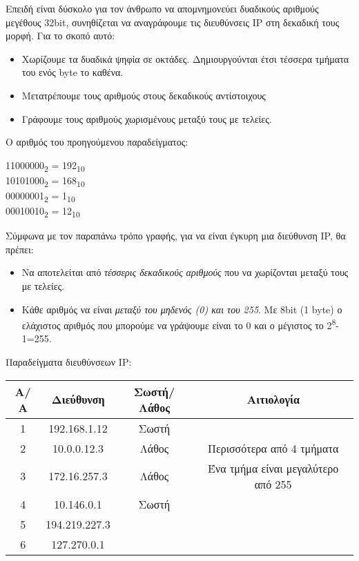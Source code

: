 Επειδή είναι δύσκολο για τον άνθρωπο να απομνημονεύει δυαδικούς αριθμούς μεγέθους 32bit, συνηθίζεται να αναγράφουμε τις διευθύνσεις IP στη δεκαδική τους μορφή. Για το σκοπό αυτό:

\begin{itemize}
\item Χωρίζουμε τα δυαδικά ψηφία σε οκτάδες. Δημιουργούνται έτσι τέσσερα τμήματα του ενός byte το καθένα.
\item Μετατρέπουμε τους αριθμούς στους δεκαδικούς αντίστοιχους
\item Γράφουμε τους αριθμούς χωρισμένους μεταξύ τους με τελείες.
\end{itemize}

Ο αριθμός του προηγούμενου παραδείγματος:

11000000\textsubscript{2} = 192\textsubscript{10}\\
10101000\textsubscript{2} = 168\textsubscript{10}\\
00000001\textsubscript{2} = 1\textsubscript{10}\\
00010010\textsubscript{2} = 12\textsubscript{10}

Σύμφωνα με τον παραπάνω τρόπο γραφής, για να είναι έγκυρη μια διεύθυνση IP, θα πρέπει:

\begin{itemize}
\item Να αποτελείται από \emph{τέσσερις δεκαδικούς αριθμούς} που να χωρίζονται μεταξύ τους με τελείες.
\item Κάθε αριθμός να είναι \emph{μεταξύ του μηδενός (0)  και του 255}. Με 8bit (1 byte) ο ελάχιστος αριθμός που μπορούμε να γράψουμε είναι το 0 και ο μέγιστος το 2\textsuperscript{8}-1=255. 
\end{itemize}

Παραδείγματα διευθύνσεων IP:

\begin{tabular}{|c|c|c|c|}
\hline
\rowcolor[gray]{0.95}
Α/Α & Διεύθυνση & Σωστή/Λάθος & Αιτιολογία\\
\hline
1 & 192.168.1.12 & Σωστή &  \\
\hline
2 & 10.0.0.12.3 & Λάθος & Περισσότερα από 4 τμήματα \\
\hline
3 & 172.16.257.3 & Λάθος & Ένα τμήμα είναι μεγαλύτερο από 255 \\
\hline
4 & 10.146.0.1 & Σωστή & \\
\hline
5 & 194.219.227.3 & & \\
\hline
6 & 127.270.0.1 & & \\
\hline
\end{tabular}

